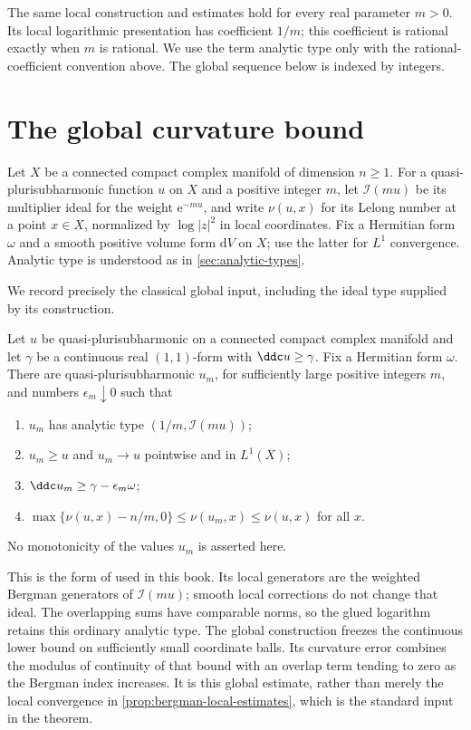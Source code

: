 The same local construction and estimates hold for every real parameter $m>0$. Its local logarithmic presentation has coefficient $1/m$; this coefficient is rational exactly when $m$ is rational. We use the term analytic type only with the rational-coefficient convention above. The global sequence below is indexed by integers.

\section{The global curvature bound}

Let $X$ be a connected compact complex manifold of dimension $n\geq1$. For a quasi-plurisubharmonic function $u$ on $X$ and a positive integer $m$, let $\mathcal I(mu)$ be its multiplier ideal for the weight $\mathrm{e}^{-mu}$, and write $\nu(u,x)$ for its Lelong number at a point $x\in X$, normalized by $\log|z|^2$ in local coordinates. Fix a Hermitian form $\omega$ and a smooth positive volume form $\mathrm{d}V$ on $X$; use the latter for $L^1$ convergence. Analytic type is understood as in \cref{sec:analytic-types}.

We record precisely the classical global input, including the ideal type supplied by its construction.

\begin{theorem}\label{thm:demailly-hermitian-input}
Let $u$ be quasi-plurisubharmonic on a connected compact complex manifold and let $\gamma$ be a continuous real $(1,1)$-form with $\ddc u\geq\gamma$. Fix a Hermitian form $\omega$. There are quasi-plurisubharmonic $u_m$, for sufficiently large positive integers $m$, and numbers $\epsilon_m\downarrow0$ such that
\begin{enumerate}
\item $u_m$ has analytic type $(1/m,\mathcal I(mu))$;
\item $u_m\geq u$ and $u_m\to u$ pointwise and in $L^1(X)$;
\item $\ddc u_m\geq\gamma-\epsilon_m\omega$;
\item $\max\{\nu(u,x)-n/m,0\}\leq\nu(u_m,x)\leq\nu(u,x)$ for all $x$.
\end{enumerate}
No monotonicity of the values $u_m$ is asserted here.
\end{theorem}

This is the form of \cite[Theorem 14.12]{DemAM11} used in this book. Its local generators are the weighted Bergman generators of $\mathcal I(mu)$; smooth local corrections do not change that ideal. The overlapping sums have comparable norms, so the glued logarithm retains this ordinary analytic type. The global construction freezes the continuous lower bound on sufficiently small coordinate balls. Its curvature error combines the modulus of continuity of that bound with an overlap term tending to zero as the Bergman index increases. It is this global estimate, rather than merely the local convergence in \cref{prop:bergman-local-estimates}, which is the standard input in the theorem.

